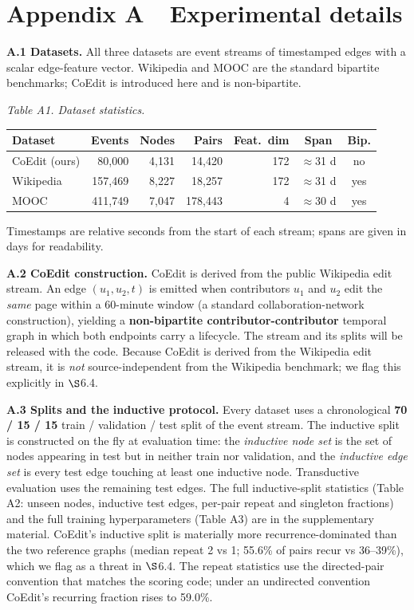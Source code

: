 \documentclass[conference]{IEEEtran}
\newcommand{\floatcap}[1]{{\footnotesize\itshape #1\par}}
\begin{document}
\appendices

\section*{Appendix A~~Experimental details}

\textbf{A.1 Datasets.} All three datasets are event streams of timestamped edges with a scalar edge-feature vector. Wikipedia and MOOC are the standard bipartite benchmarks; CoEdit is introduced here and is non-bipartite.

\begin{table}[h]
\centering
\floatcap{Table A1. Dataset statistics.}
\footnotesize
\begin{tabular}{@{}lrrrrcc@{}}
\toprule
Dataset & Events & Nodes & Pairs & Feat.\ dim & Span & Bip. \\
\midrule
CoEdit (ours) & 80,000 & 4,131 & 14,420 & 172 & $\approx$31 d & no \\
Wikipedia & 157,469 & 8,227 & 18,257 & 172 & $\approx$31 d & yes \\
MOOC & 411,749 & 7,047 & 178,443 & 4 & $\approx$30 d & yes \\
\bottomrule
\end{tabular}
\end{table}

Timestamps are relative seconds from the start of each stream; spans are given in days for readability.

\textbf{A.2 CoEdit construction.} CoEdit is derived from the public Wikipedia edit stream. An edge \((u_1, u_2, t)\) is emitted when contributors \(u_1\) and \(u_2\) edit the \emph{same} page within a 60-minute window (a standard collaboration-network construction), yielding a \textbf{non-bipartite contributor-contributor} temporal graph in which both endpoints carry a lifecycle. The stream and its splits will be released with the code. Because CoEdit is derived from the Wikipedia edit stream, it is \emph{not} source-independent from the Wikipedia benchmark; we flag this explicitly in $\S$6.4.

\textbf{A.3 Splits and the inductive protocol.} Every dataset uses a chronological \textbf{70 / 15 / 15} train / validation / test split of the event stream. The inductive split is constructed on the fly at evaluation time: the \emph{inductive node set} is the set of nodes appearing in test but in neither train nor validation, and the \emph{inductive edge set} is every test edge touching at least one inductive node. Transductive evaluation uses the remaining test edges. The full inductive-split statistics (Table A2: unseen nodes, inductive test edges, per-pair repeat and singleton fractions) and the full training hyperparameters (Table A3) are in the supplementary material. CoEdit's inductive split is materially more recurrence-dominated than the two reference graphs (median repeat 2 vs 1; 55.6\% of pairs recur vs 36--39\%), which we flag as a threat in $\S$6.4. The repeat statistics use the directed-pair convention that matches the scoring code; under an undirected convention CoEdit's recurring fraction rises to 59.0\%.
\end{document}
